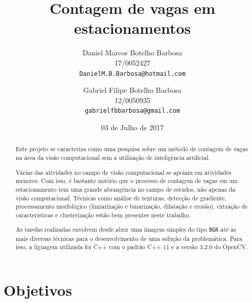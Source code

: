 \documentclass[10pt,twocolumn,letterpaper]{article}
\begin{document}
\title{Contagem de vagas em estacionamentos}

\date{03 de Julho de 2017}

\author{Daniel Marcos Botelho Barbosa\\
17/0052427\\
{\tt\small DanielM.B.Barbosa@hotmail.com}\\
\and
Gabriel Filipe Botelho Barbosa\\
12/0050935\\
{\tt\small gabrielfbbarbosa@gmail.com}
}

\maketitle






\begin{abstract}
	Este projeto se caracteriza como uma pesquisa sobre um método de contagem
de vagas na área da visão computacional sem a utilização de inteligência artificial.

	Várias das atividades no campo de visão computacional se apoiam em atividades
menores. Com isso, é bastante notório que o processo de contagem de vagas em um
estacionamento tem uma grande abrangência no campo de estudos, não apenas da
visão computacional. Técnicas como análise de texturas, detecção de gradiente,
processamento morfológico (limiarização e binarização, dilatação e erosão), extração
de características e clusterização estão bem presentes neste trabalho.

	As tarefas realizadas envolvem desde abrir uma imagem simples do tipo \verb'BGR'
até as mais diversas técnicas para o desenvolvimento de uma solução da problemática.
Para isso, a liguagem utilizada foi C++ com o padrão C++ 11 e a versão 3.2.0 do OpenCV.\\
\end{abstract}





\section{Objetivos}
\end{document}
